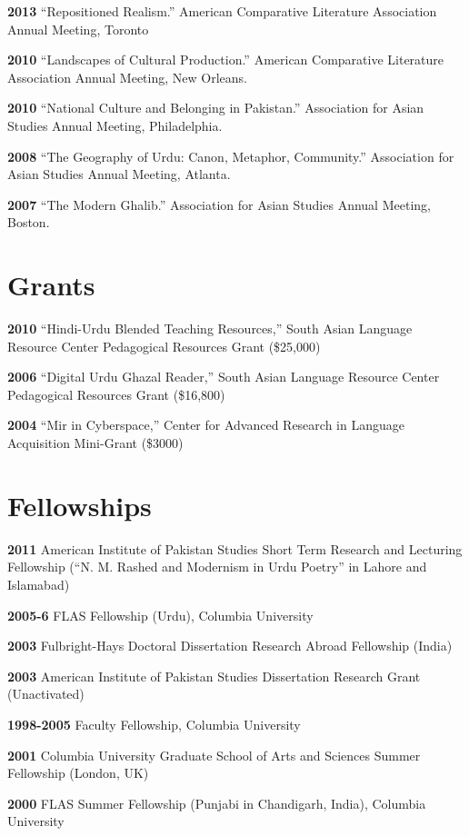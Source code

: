\documentclass[letterpaper,12pt]{article}
\begin{document}
\textbf{2013}
“Repositioned Realism.”
American Comparative Literature Association Annual Meeting, Toronto

\textbf{2010}
“Landscapes of Cultural Production.”
American Comparative Literature Association Annual Meeting, New Orleans.

\textbf{2010}
“National Culture and Belonging in Pakistan.”
Association for Asian Studies Annual Meeting, Philadelphia.

\textbf{2008}
“The Geography of Urdu: Canon, Metaphor, Community.”
Association for Asian Studies Annual Meeting, Atlanta.

\textbf{2007}
“The Modern Ghalib.”
Association for Asian Studies Annual Meeting, Boston.


\section{Grants%
  \label{grants}%
}

\textbf{2010}
“Hindi-Urdu Blended Teaching Resources,”
South Asian Language Resource Center Pedagogical Resources Grant (\$25,000)

\textbf{2006}
“Digital Urdu Ghazal Reader,”
South Asian Language Resource Center Pedagogical Resources Grant (\$16,800)

\textbf{2004}
“Mir in Cyberspace,”
Center for Advanced Research in Language Acquisition Mini-Grant (\$3000)


\section{Fellowships%
  \label{fellowships}%
}

\textbf{2011}
American Institute of Pakistan Studies
Short Term Research and Lecturing Fellowship
(“N. M. Rashed and Modernism in Urdu Poetry” in Lahore and Islamabad)

\textbf{2005-6}
FLAS Fellowship (Urdu), Columbia University

\textbf{2003}
Fulbright-Hays Doctoral Dissertation Research Abroad Fellowship (India)

\textbf{2003}
American Institute of Pakistan Studies Dissertation Research Grant (Unactivated)

\textbf{1998-2005}
Faculty Fellowship, Columbia University

\textbf{2001}
Columbia University Graduate School of Arts and Sciences Summer Fellowship (London, UK)

\textbf{2000}
FLAS Summer Fellowship (Punjabi in Chandigarh, India), Columbia University
\end{document}
